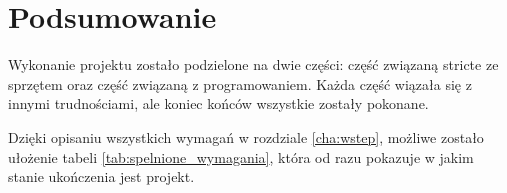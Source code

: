 \section{Podsumowanie}
\label{sec:podsumowanie_specyfikacja_projektu}

Wykonanie projektu zostało podzielone na dwie części: część związaną stricte ze sprzętem oraz część związaną z programowaniem. Każda część wiązała się z innymi trudnościami, ale koniec końców wszystkie zostały pokonane.

Dzięki opisaniu wszystkich wymagań w rozdziale \ref{cha:wstep}, możliwe zostało ułożenie tabeli \ref{tab:spelnione_wymagania}, która od razu pokazuje w jakim stanie ukończenia jest projekt.
